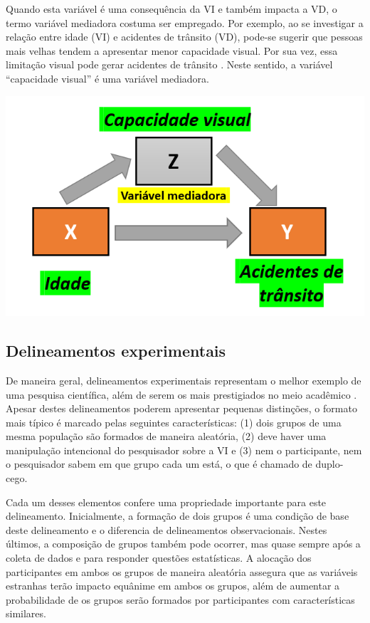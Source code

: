 \documentclass[
]{book}
\begin{document}
Quando esta variável é uma consequência da VI e também impacta a VD, o termo variável mediadora costuma ser empregado. Por exemplo, ao se investigar a relação entre idade (VI) e acidentes de trânsito (VD), pode-se sugerir que pessoas mais velhas tendem a apresentar menor capacidade visual. Por sua vez, essa limitação visual pode gerar acidentes de trânsito \citep{Rhodes2011}. Neste sentido, a variável ``capacidade visual'' é uma variável mediadora.

\includegraphics{./img/cap_mediacao.png}

\hypertarget{delineamentos-experimentais}{%
\subsection{Delineamentos experimentais}\label{delineamentos-experimentais}}

De maneira geral, delineamentos experimentais representam o melhor exemplo de uma pesquisa científica, além de serem os mais prestigiados no meio acadêmico \citep{gil2002}. Apesar destes delineamentos poderem apresentar pequenas distinções, o formato mais típico é marcado pelas seguintes características: (1) dois grupos de uma mesma população são formados de maneira aleatória, (2) deve haver uma manipulação intencional do pesquisador sobre a VI e (3) nem o participante, nem o pesquisador sabem em que grupo cada um está, o que é chamado de duplo-cego.

Cada um desses elementos confere uma propriedade importante para este delineamento. Inicialmente, a formação de dois grupos é uma condição de base deste delineamento e o diferencia de delineamentos observacionais. Nestes últimos, a composição de grupos também pode ocorrer, mas quase sempre após a coleta de dados e para responder questões estatísticas. A alocação dos participantes em ambos os grupos de maneira aleatória assegura que as variáveis estranhas terão impacto equânime em ambos os grupos, além de aumentar a probabilidade de os grupos serão formados por participantes com características similares.
\end{document}

